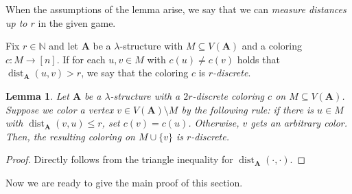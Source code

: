 \documentclass[11pt]{article}
\theoremstyle{plain}
\newtheorem{lemma}[theorem]{Lemma}
\theoremstyle{definition}
\theoremstyle{remark}
\DeclareMathOperator\dist{dist}
\newcommand{\N}{\mathbb{N}}
\newcommand{\str}[1]{\mathbf{#1}}
\begin{document}
When the assumptions of the lemma arise, we say that we can \emph{measure distances up to $r$} in the given game.

Fix $r \in \N$ and let $\str{A}$ be a $\lambda$-structure with $M \subseteq V(\str{A})$ and a coloring $c: M \to [n]$.
If for each $u,v \in M$ with $c(u) \not= c(v)$ holds that $\dist_\str{A}(u,v) > r$, we say that the coloring $c$ is \emph{$r$-discrete}.

\begin{lemma}\label{lem:about_discrete_colorings}
    Let $\str{A}$ be a $\lambda$-structure with a $2r$-discrete coloring $c$ on $M \subseteq V(\str{A})$.
    Suppose we color a vertex $v \in V(\str{A}) \setminus M$ by the following rule:
    if there is $u \in M$ with $\dist_\str{A}(v,u) \leq r$, set $c(v) = c(u)$.
    Otherwise, $v$ gets an arbitrary color.
    Then, the resulting coloring on $M \cup \{v\}$ is $r$-discrete.
\end{lemma}
\begin{proof}
    Directly follows from the triangle inequality for $\dist_\str{A}(\cdot, \cdot)$.
\end{proof}

Now we are ready to give the main proof of this section.
\end{document}
